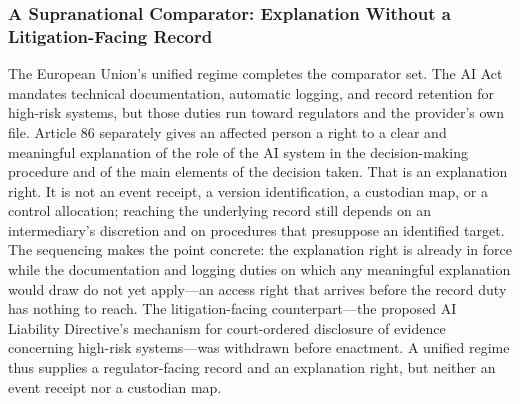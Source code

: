 \subsubsection{A Supranational Comparator: Explanation Without a Litigation-Facing Record}

The European Union's unified regime completes the comparator set. The AI Act mandates technical documentation, automatic logging, and record retention for high-risk systems, but those duties run toward regulators and the provider's own file. Article 86 separately gives an affected person a right to a clear and meaningful explanation of the role of the AI system in the decision-making procedure and of the main elements of the decision taken. That is an explanation right. It is not an event receipt, a version identification, a custodian map, or a control allocation; reaching the underlying record still depends on an intermediary's discretion and on procedures that presuppose an identified target. The sequencing makes the point concrete: the explanation right is already in force while the documentation and logging duties on which any meaningful explanation would draw do not yet apply---an access right that arrives before the record duty has nothing to reach. The litigation-facing counterpart---the proposed AI Liability Directive's mechanism for court-ordered disclosure of evidence concerning high-risk systems---was withdrawn before enactment. A unified regime thus supplies a regulator-facing record and an explanation right, but neither an event receipt nor a custodian map.

